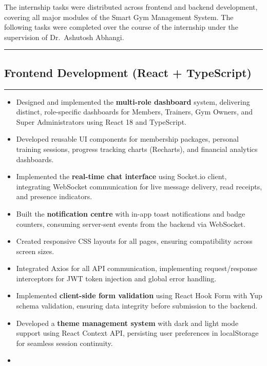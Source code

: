\documentclass[
  12pt,
  a4paperpaper,
]{report}
\providecommand{\tightlist}{%
  \setlength{\itemsep}{0pt}\setlength{\parskip}{0pt}}
\begin{document}
The internship tasks were distributed across frontend and backend
development, covering all major modules of the Smart Gym Management
System. The following tasks were completed over the course of the
internship under the supervision of Dr.~Ashutosh Abhangi.

\medskip\noindent

\rule{\textwidth}{0.3pt}

\subsection{Frontend Development (React +
TypeScript)}\label{frontend-development-react-typescript}

\noindent

\rule{\textwidth}{0.3pt}\medskip

\begin{itemize}
\tightlist
\item
  Designed and implemented the \textbf{multi-role dashboard} system,
  delivering distinct, role-specific dashboards for Members, Trainers,
  Gym Owners, and Super Administrators using React 18 and TypeScript.
\item
  Developed reusable UI components for membership packages, personal
  training sessions, progress tracking charts (Recharts), and financial
  analytics dashboards.
\item
  Implemented the \textbf{real-time chat interface} using Socket.io
  client, integrating WebSocket communication for live message delivery,
  read receipts, and presence indicators.
\item
  Built the \textbf{notification centre} with in-app toast notifications
  and badge counters, consuming server-sent events from the backend via
  WebSocket.
\item
  Created responsive CSS layouts for all pages, ensuring compatibility
  across screen sizes.
\item
  Integrated Axios for all API communication, implementing
  request/response interceptors for JWT token injection and global error
  handling.
\item
  Implemented \textbf{client-side form validation} using React Hook Form
  with Yup schema validation, ensuring data integrity before submission
  to the backend.
\item
  Developed a \textbf{theme management system} with dark and light mode
  support using React Context API, persisting user preferences in
  localStorage for seamless session continuity.
\item

\end{itemize}
\end{document}
